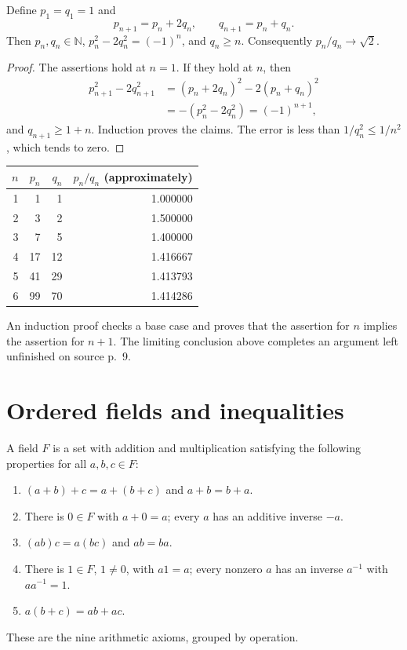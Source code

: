 \begin{proposition}
Define $p_1=q_1=1$ and
\[
p_{n+1}=p_n+2q_n,\qquad q_{n+1}=p_n+q_n.
\]
Then $p_n,q_n\in\mathbb N$, $p_n^2-2q_n^2=(-1)^n$, and $q_n\geq n$.
Consequently $p_n/q_n\to\sqrt2$.
\end{proposition}
\begin{proof}
The assertions hold at $n=1$. If they hold at $n$, then
\begin{align*}
p_{n+1}^2-2q_{n+1}^2
&=(p_n+2q_n)^2-2(p_n+q_n)^2\\
&=-(p_n^2-2q_n^2)=(-1)^{n+1},
\end{align*}
and $q_{n+1}\geq1+n$. Induction proves the claims. The error is less than
$1/q_n^2\leq1/n^2$, which tends to zero.
\end{proof}
\begin{center}
\begin{tabular}{rrrr}
\toprule
$n$&$p_n$&$q_n$&$p_n/q_n$ (approximately)\\\midrule
1&1&1&1.000000\\
2&3&2&1.500000\\
3&7&5&1.400000\\
4&17&12&1.416667\\
5&41&29&1.413793\\
6&99&70&1.414286\\\bottomrule
\end{tabular}
\end{center}
\begin{remark}
An induction proof checks a base case and proves that the assertion for $n$
implies the assertion for $n+1$. The limiting conclusion above completes an
argument left unfinished on source p.~9.
\end{remark}

\section{Ordered fields and inequalities}
\begin{definition}[Field]
A field $F$ is a set with addition and multiplication satisfying the following
properties for all $a,b,c\in F$:
\begin{enumerate}
\item $(a+b)+c=a+(b+c)$ and $a+b=b+a$.
\item There is $0\in F$ with $a+0=a$; every $a$ has an additive inverse $-a$.
\item $(ab)c=a(bc)$ and $ab=ba$.
\item There is $1\in F$, $1\ne0$, with $a1=a$; every nonzero $a$ has an
inverse $a^{-1}$ with $aa^{-1}=1$.
\item $a(b+c)=ab+ac$.
\end{enumerate}
These are the nine arithmetic axioms, grouped by operation.
\end{definition}

